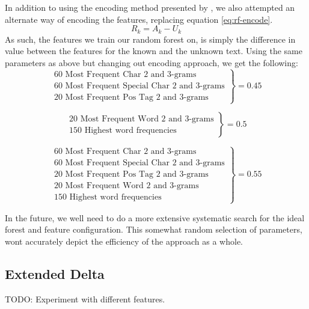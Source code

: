 In addition to using the encoding method presented by \cite{pacheco2015}, we also attempted an alternate way of encoding the features, replacing equation \ref{eq:rf-encode}.
$$
R_k = A_k - U_k
$$
As such, the features we train our random forest on, is simply the difference in value between the features for the known and the unknown text. Using the same parameters as above but changing out encoding approach, we get the following:
$$
\left.
                \begin{array}{ll}
                  \text{60 Most Frequent Char 2 and 3-grams}\\
                  \text{60 Most Frequent Special Char 2 and 3-grams}\\
                  \text{20 Most Frequent Pos Tag 2 and 3-grams}
                \end{array}
              \right\rbrace = 0.45
$$

$$
\left.
                \begin{array}{ll}
                  \text{20 Most Frequent Word 2 and 3-grams}\\
                  \text{150 Highest word frequencies}
                \end{array}
              \right\rbrace = 0.5
$$

$$
\left.
                \begin{array}{ll}
                  \text{60 Most Frequent Char 2 and 3-grams}\\
                  \text{60 Most Frequent Special Char 2 and 3-grams}\\
                  \text{20 Most Frequent Pos Tag 2 and 3-grams}\\
                  \text{20 Most Frequent Word 2 and 3-grams}\\
                  \text{150 Highest word frequencies}
                \end{array}
              \right\rbrace = 0.55
$$

In the future, we well need to do a more extensive systematic search for the ideal forest and feature configuration. This somewhat random selection of parameters, wont accurately depict the efficiency of the  approach as a whole.

\subsection{Extended Delta}
TODO: Experiment with different features.

